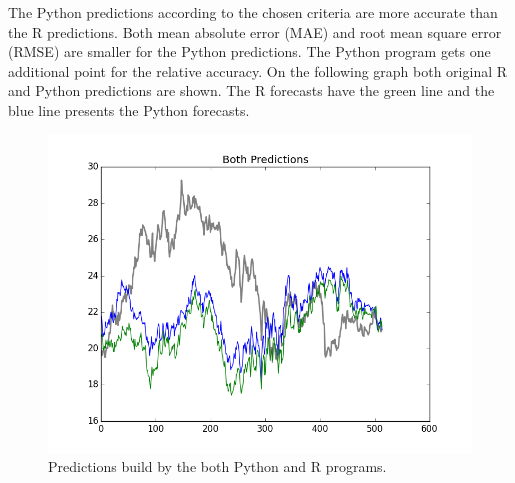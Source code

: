 \documentclass[
  twoside,
  11pt, a4paper,
  footinclude=true,
  headinclude=true,
  cleardoublepage=empty
]{scrreprt}
\begin{document}
    The Python predictions according to the chosen criteria are more accurate than the R predictions. Both mean absolute error (MAE) and root mean square error (RMSE) are smaller for the Python predictions. The Python program gets one additional point for the relative accuracy. On the following graph both original R and Python predictions are shown. The R forecasts have the green line and the blue line presents the Python forecasts.
    
    \begin{figure}[h]
        \includegraphics[scale=0.5]{img_examples/BothPredictions.png}
        \centering
        \caption{Predictions build by the both Python and R programs.}
        \label{fig:BothPredictions}
    \end{figure}
    
\end{document}
